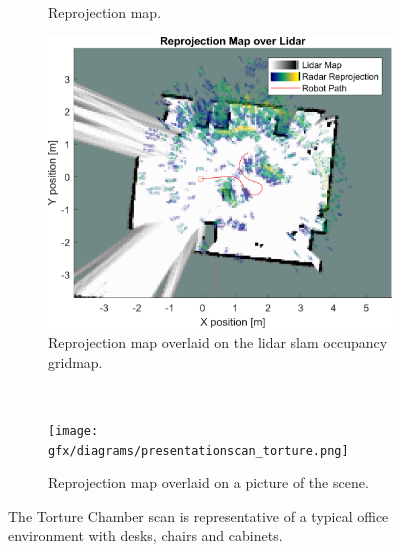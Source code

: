 \begin{figure}[htbp]
\begin{subfigure}[t]{.4\textwidth}
        \caption{Reprojection map.}
        \label{fig:pres3-r}
    \end{subfigure}%
    \hfill%
    \begin{subfigure}[t]{.45\textwidth}
        \includegraphics[max width=\linewidth]{gfx/results/torturechamber_map.png}
        \caption{Reprojection map overlaid on the lidar slam occupancy gridmap.}
        \label{fig:pres3-l}
    \end{subfigure}\bigskip\\
    \begin{subfigure}{.9\textwidth}
        \texttt{[image: gfx/diagrams/presentationscan\_torture.png]}
        \caption{Reprojection map overlaid on a picture of the scene.}
        \label{fig:pres3-3d}
    \end{subfigure}
    \caption{The Torture Chamber scan is representative of a typical office environment with desks, chairs and cabinets.}
    \label{fig:pres3}
\end{figure}

